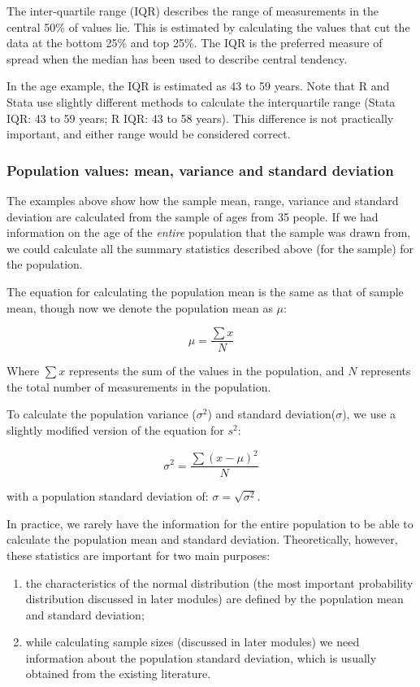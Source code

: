 \documentclass[
  a4paper,
]{memoir}
\providecommand{\tightlist}{%
  \setlength{\itemsep}{0pt}\setlength{\parskip}{0pt}}\usepackage{longtable,booktabs,array}
\begin{document}
The inter-quartile range (IQR) describes the range of measurements in
the central 50\% of values lie. This is estimated by calculating the
values that cut the data at the bottom 25\% and top 25\%. The IQR is the
preferred measure of spread when the median has been used to describe
central tendency.

In the age example, the IQR is estimated as 43 to 59 years. Note that R
and Stata use slightly different methods to calculate the interquartile
range (Stata IQR: 43 to 59 years; R IQR: 43 to 58 years). This
difference is not practically important, and either range would be
considered correct.

\hypertarget{population-values-mean-variance-and-standard-deviation}{%
\subsubsection{Population values: mean, variance and standard
deviation}\label{population-values-mean-variance-and-standard-deviation}}

The examples above show how the sample mean, range, variance and
standard deviation are calculated from the sample of ages from 35
people. If we had information on the age of the \emph{entire} population
that the sample was drawn from, we could calculate all the summary
statistics described above (for the sample) for the population.

The equation for calculating the population mean is the same as that of
sample mean, though now we denote the population mean as \(\mu\):

\[ \mu = \frac{\sum{x}}{N} \]

Where \(\sum{x}\) represents the sum of the values in the population,
and \(N\) represents the total number of measurements in the population.

To calculate the population variance (\(\sigma^2\)) and standard
deviation(\(\sigma\)), we use a slightly modified version of the
equation for \(s^2\):

\[ \sigma^2 = \frac{\sum(x - \mu)^2}{N} \]

with a population standard deviation of: \(\sigma = \sqrt{\sigma^2}\).

In practice, we rarely have the information for the entire population to
be able to calculate the population mean and standard deviation.
Theoretically, however, these statistics are important for two main
purposes:

\begin{enumerate}
\def\labelenumi{\arabic{enumi}.}
\tightlist
\item
  the characteristics of the normal distribution (the most important
  probability distribution discussed in later modules) are defined by
  the population mean and standard deviation;
\item
  while calculating sample sizes (discussed in later modules) we need
  information about the population standard deviation, which is usually
  obtained from the existing literature.
\end{enumerate}
\end{document}
